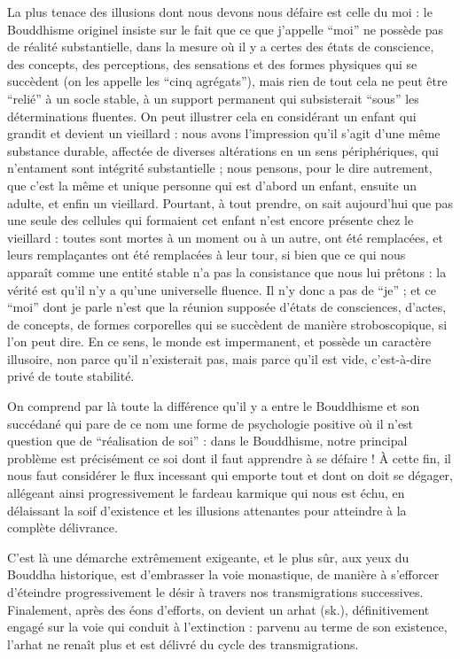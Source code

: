 \documentclass[11pt,a4paper]{article} %
\begin{document}
La plus tenace des illusions dont nous devons nous défaire est celle du moi : le Bouddhisme originel insiste sur le fait que ce que j'appelle ``moi'' ne possède pas de réalité
substantielle, dans la mesure où il y a certes des états de conscience, des concepts, des
perceptions, des sensations et des formes physiques qui se succèdent (on les appelle les
``cinq agrégats''), mais rien de tout cela ne peut être ``relié'' à un socle stable, à un
support permanent qui subsisterait ``sous'' les déterminations fluentes.
On peut illustrer
cela en considérant un enfant qui grandit et devient un vieillard : nous avons
l'impression qu'il s'agit d'une même substance durable, affectée de diverses altérations
en un sens périphériques, qui n'entament sont intégrité substantielle ; nous pensons,
pour le dire autrement, que c'est la même et unique personne qui est d'abord un enfant,
ensuite un adulte, et enfin un vieillard.
Pourtant, à tout prendre, on sait aujourd'hui que
pas une seule des cellules qui formaient cet enfant n'est encore présente chez le vieillard : toutes sont mortes à un moment ou à un autre, ont été remplacées, et leurs
remplaçantes ont été remplacées à leur tour, si bien que ce qui nous apparaît comme une
entité stable n'a pas la consistance que nous lui prêtons : la vérité est qu'il n'y a qu'une
universelle fluence.
Il n'y donc a pas de ``je'' ; et ce ``moi'' dont je parle n'est que la
réunion supposée d'états de consciences, d'actes, de concepts, de formes corporelles qui
se succèdent de manière stroboscopique, si l'on peut dire.
En ce sens, le monde est impermanent, et possède un caractère illusoire, non parce qu'il n'existerait pas, mais parce
qu'il est vide, c'est-à-dire privé de toute stabilité.

On comprend par là toute la différence qu'il y a entre le Bouddhisme et son succédané
qui pare de ce nom une forme de psychologie positive où il n'est question que de ``réalisation de soi'' : dans le Bouddhisme, notre principal problème est précisément ce soi
dont il faut apprendre à se défaire ! À cette fin, il nous faut considérer le flux incessant
qui emporte tout et dont on doit se dégager, allégeant ainsi progressivement le fardeau
karmique qui nous est échu, en délaissant la soif d'existence et les illusions attenantes
pour atteindre à la complète délivrance.

C'est là une démarche extrêmement exigeante, et le plus sûr, aux yeux du Bouddha historique, est d'embrasser la voie monastique, de manière à s'efforcer d'éteindre
progressivement le désir à travers nos transmigrations successives.
Finalement, après
des éons d'efforts, on devient un arhat (sk.), définitivement engagé sur la voie qui
conduit à l'extinction : parvenu au terme de son existence, l'arhat ne renaît plus et est
délivré du cycle des transmigrations.
\end{document}
